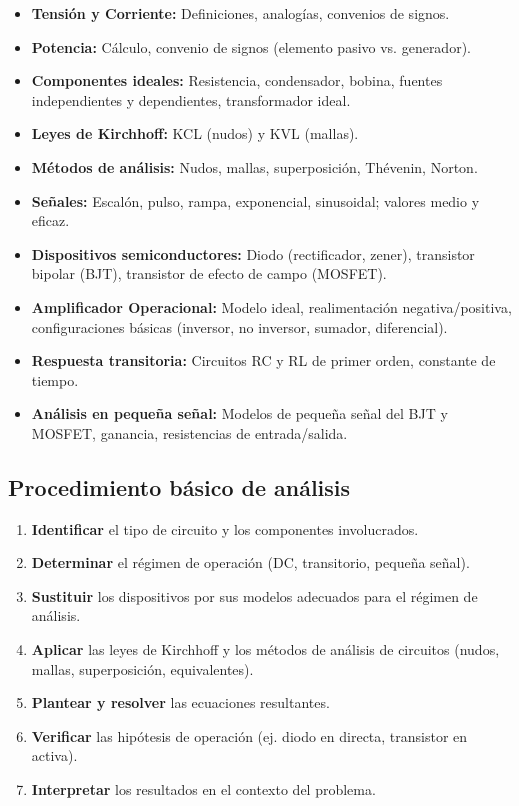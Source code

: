 \documentclass[11pt,a4paper]{article}
\begin{document}
\begin{itemize}[leftmargin=*,topsep=2pt,itemsep=1pt]
  \item \textbf{Tensión y Corriente:} Definiciones, analogías, convenios de signos.
  \item \textbf{Potencia:} Cálculo, convenio de signos (elemento pasivo vs. generador).
  \item \textbf{Componentes ideales:} Resistencia, condensador, bobina, fuentes independientes y dependientes, transformador ideal.
  \item \textbf{Leyes de Kirchhoff:} KCL (nudos) y KVL (mallas).
  \item \textbf{Métodos de análisis:} Nudos, mallas, superposición, Thévenin, Norton.
  \item \textbf{Señales:} Escalón, pulso, rampa, exponencial, sinusoidal; valores medio y eficaz.
  \item \textbf{Dispositivos semiconductores:} Diodo (rectificador, zener), transistor bipolar (BJT), transistor de efecto de campo (MOSFET).
  \item \textbf{Amplificador Operacional:} Modelo ideal, realimentación negativa/positiva, configuraciones básicas (inversor, no inversor, sumador, diferencial).
  \item \textbf{Respuesta transitoria:} Circuitos RC y RL de primer orden, constante de tiempo.
  \item \textbf{Análisis en pequeña señal:} Modelos de pequeña señal del BJT y MOSFET, ganancia, resistencias de entrada/salida.
\end{itemize}


\subsection*{Procedimiento básico de análisis}


\begin{enumerate}[leftmargin=*,topsep=2pt,itemsep=1pt]
  \item \textbf{Identificar} el tipo de circuito y los componentes involucrados.
  \item \textbf{Determinar} el régimen de operación (DC, transitorio, pequeña señal).
  \item \textbf{Sustituir} los dispositivos por sus modelos adecuados para el régimen de análisis.
  \item \textbf{Aplicar} las leyes de Kirchhoff y los métodos de análisis de circuitos (nudos, mallas, superposición, equivalentes).
  \item \textbf{Plantear y resolver} las ecuaciones resultantes.
  \item \textbf{Verificar} las hipótesis de operación (ej. diodo en directa, transistor en activa).
  \item \textbf{Interpretar} los resultados en el contexto del problema.
\end{enumerate}
\end{document}
